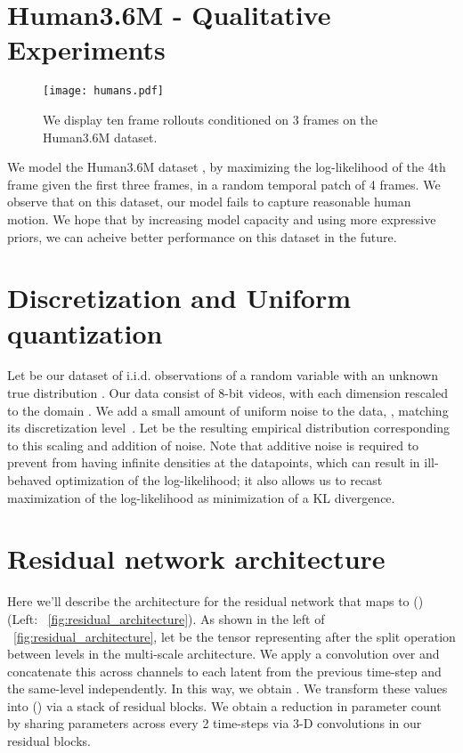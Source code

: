 \documentclass{article} \usepackage{iclr2020_conference,times}
\newcommand{\figref}[1]{\figurename~\ref{#1}}
\begin{document}
\section{Human3.6M - Qualitative Experiments}

\begin{figure}[h]
\centering
\texttt{[image: humans.pdf]}
\caption{We display ten frame rollouts conditioned on 3 frames on the Human3.6M dataset.}
\label{human_36m}
\end{figure}

We model the Human3.6M dataset \citep{ionescu2014human3}, by  maximizing the log-likelihood of the 4th frame given the first three frames, in a random temporal patch of 4 frames. We observe that on this dataset, our model fails to capture reasonable human motion. We hope that by increasing model capacity and using more expressive priors, we can acheive better performance on this dataset in the future.



\section{Discretization and Uniform quantization}

Let  be our dataset of i.i.d. observations of a random variable  with an unknown true distribution . Our data consist of 8-bit videos, with each dimension rescaled to the domain . We add a small amount of uniform noise to the data, , matching its discretization level~\citep{dinh2016density,kingma2018glow}. Let  be the resulting empirical distribution corresponding to this scaling and addition of noise. Note that additive noise is required to prevent  from having infinite densities at the datapoints, which can result in ill-behaved optimization of the log-likelihood; it also allows us to recast maximization of the log-likelihood as minimization of a KL divergence.


\section{Residual network architecture}
\label{sec:res_net_arch}
Here we'll describe the architecture for the residual network  that maps  to () (Left: \figref{fig:residual_architecture}). As shown in the left of \figref{fig:residual_architecture}, let  be the tensor representing  after the split operation between levels in the multi-scale architecture. We apply a  convolution over  and concatenate this across channels to each latent from the previous time-step and the same-level independently. In this way, we obtain .
We transform these values into () via a stack of residual blocks. We obtain a reduction in parameter count by sharing parameters across every 2 time-steps via 3-D convolutions in our residual blocks.
\end{document}
